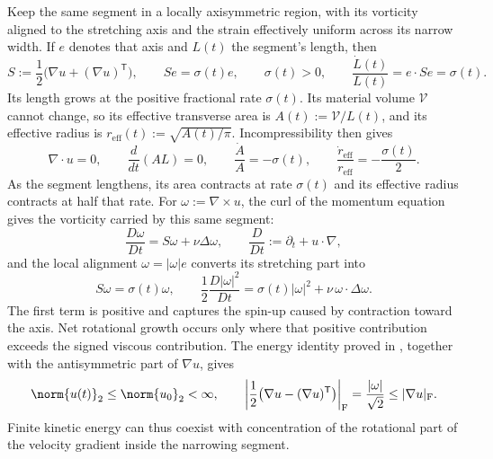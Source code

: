 Keep the same segment in a locally axisymmetric region, with its vorticity aligned to the stretching axis and the strain effectively uniform across its narrow width. If \(e\) denotes that axis and \(L(t)\) the segment's length, then
\[
  S:=\frac12\bigl(\nabla u+(\nabla u)^{\mathsf T}\bigr),
  \qquad
  Se=\sigma(t)e,
  \qquad
  \sigma(t)>0,
  \qquad
  \frac{\dot L(t)}{L(t)}
  =
  e\cdot Se
  =
  \sigma(t).
\]
Its length grows at the positive fractional rate \(\sigma(t)\). Its material volume \(\mathcal V\) cannot change, so its effective transverse area is \(A(t):=\mathcal V/L(t)\), and its effective radius is \(r_{\mathrm{eff}}(t):=\sqrt{A(t)/\pi}\). Incompressibility then gives
\[
  \nabla\cdot u=0,
  \qquad
  \frac{d}{dt}(A L)=0,
  \qquad
  \frac{\dot A}{A}=-\sigma(t),
  \qquad
  \frac{\dot r_{\mathrm{eff}}}{r_{\mathrm{eff}}}
  =
  -\frac{\sigma(t)}{2}.
\]
As the segment lengthens, its area contracts at rate \(\sigma(t)\) and its effective radius contracts at half that rate. For \(\omega:=\nabla\times u\), the curl of the momentum equation gives the vorticity carried by this same segment:
\[
  \frac{D\omega}{Dt}
  =
  S\omega+\nu\Delta\omega,
  \qquad
  \frac{D}{Dt}
  :=
  \partial_t+u\cdot\nabla,
\]
and the local alignment \(\omega=|\omega|e\) converts its stretching part into
\[
  S\omega
  =
  \sigma(t)\omega,
  \qquad
  \frac12\frac{D|\omega|^2}{Dt}
  =
  \sigma(t)|\omega|^2
  +
  \nu\,\omega\cdot\Delta\omega.
\]
The first term is positive and captures the spin-up caused by contraction toward the axis. Net rotational growth occurs only where that positive contribution exceeds the signed viscous contribution. The energy identity proved in , together with the antisymmetric part of \(\nabla u\), gives
\[
  \norm{u(t)}_2
  \leq
  \norm{u_0}_2
  <\infty,
  \qquad
  \left|\frac12\bigl(\nabla u-(\nabla u)^{\mathsf T}\bigr)\right|_{\mathrm F}
  =
  \frac{|\omega|}{\sqrt2}
  \leq
  |\nabla u|_{\mathrm F}.
\]
Finite kinetic energy can thus coexist with concentration of the rotational part of the velocity gradient inside the narrowing segment.


